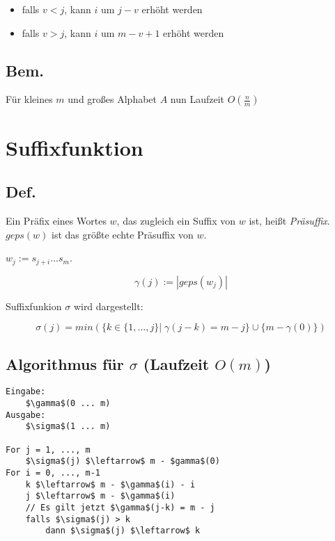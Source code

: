 \documentclass[8pt, DIV15, twocolumn]{scrartcl}
\begin{document}
\begin{itemize}
	\item falls $v < j$, kann $i$ um $j-v$ erhöht werden
	\item falls $v > j$, kann $i$ um $m-v+1$ erhöht werden
\end{itemize}

\subsection*{Bem.}
Für kleines $m$ und großes Alphabet $A$ nun Laufzeit $O(\frac{n}{m})$


\section*{Suffixfunktion}

\subsection*{Def.}
Ein Präfix eines Wortes $w$, das zugleich ein Suffix von $w$ ist, heißt \emph{Präsuffix}. $geps(w)$ ist das größte echte Präsuffix von $w$.

$w_j := s_{j+i} ... s_m$.

\begin{equation*}
\gamma \left( j \right) := |geps \left( w_j \right)|
\end{equation*}

Suffixfunkion $\sigma$ wird dargestellt:

\begin{equation*}
\sigma \left( j \right) = min \left( \{k \in \{1, ..., j\}| \; \gamma \left(j-k \right) = m-j\} \cup \{m - \gamma \left(0 \right)\} \right)
\end{equation*}

\subsection*{Algorithmus für $\sigma$ (Laufzeit $O\left(m\right)$)}

\begin{lstlisting}[mathescape=true]
Eingabe:
	$\gamma$(0 ... m)
Ausgabe:
	$\sigma$(1 ... m)

For j = 1, ..., m
	$\sigma$(j) $\leftarrow$ m - $gamma$(0)
For i = 0, ..., m-1
	k $\leftarrow$ m - $\gamma$(i) - i
	j $\leftarrow$ m - $\gamma$(i)
	// Es gilt jetzt $\gamma$(j-k) = m - j
	falls $\sigma$(j) > k
		dann $\sigma$(j) $\leftarrow$ k
\end{lstlisting}
\end{document}
